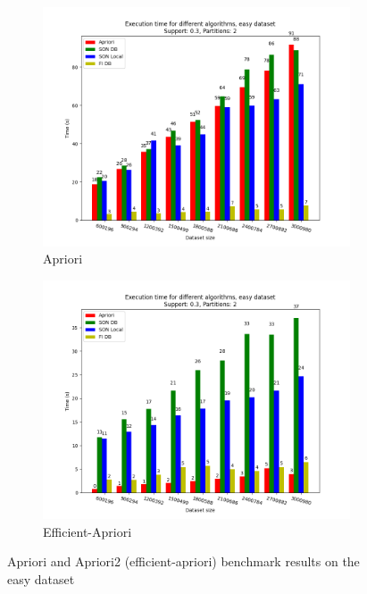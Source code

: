 \documentclass[a4paper]{article}
\begin{document}
	\begin{figure}[h]
		\centering
		\begin{subfigure}[b]{0.49\textwidth}
			\centering
			\includegraphics[width=\textwidth]{easy_aprioribenchmark.png}
         	\caption{Apriori}
		\end{subfigure}
		\hfill		
		\begin{subfigure}[b]{0.49\textwidth}
			\centering
			\includegraphics[width=\textwidth]{easy_apriori2benchmark.png}
         	\caption{Efficient-Apriori}
		\end{subfigure}
		\hfill
		\caption{Apriori and Apriori2 (efficient-apriori) benchmark results on the easy dataset}
		\label{fig:aprioribenchmark-e}
	\end{figure}
\end{document}
